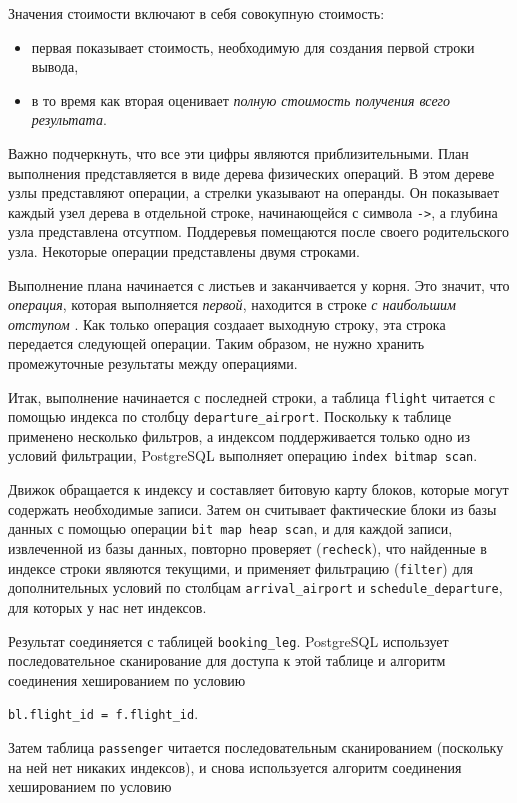 \documentclass[%
	11pt,
	a4paper,
	utf8,
		]{article}
\begin{document}
Значения стоимости включают в себя совокупную стоимость:
\begin{itemize}
	\item первая показывает стоимость, необходимую для создания первой строки вывода,
	
	\item  в то время как вторая оценивает \emph{полную стоимость получения всего результата}.
\end{itemize}

Важно подчеркнуть, что все эти цифры являются приблизительными. План выполнения представляется в виде дерева физических операций. В этом дереве узлы представляют операции, а стрелки указывают на операнды. Он показывает каждый узел дерева в отдельной строке, начинающейся с символа \verb|->|, а глубина узла представлена отсутпом. Поддеревья помещаются после своего родительского узла. Некоторые операции представлены двумя строками.

Выполнение плана начинается с листьев и заканчивается у корня. Это значит, что \emph{операция}, которая выполняется \emph{первой}, находится в строке \emph{с наибольшим отступом} \cite[]{dombrovskaya:postgresql-2022}. Как только операция создаает выходную строку, эта строка передается следующей операции. Таким образом, не нужно хранить промежуточные результаты между операциями.

Итак, выполнение начинается с последней строки, а таблица \verb|flight| читается с помощью индекса по столбцу \verb|departure_airport|. Поскольку к таблице применено несколько фильтров, а индексом поддерживается только одно из условий фильтрации, PostgreSQL выполняет операцию \verb|index bitmap scan|. 

Движок обращается к индексу и составляет битовую карту блоков, которые могут содержать необходимые записи. Затем он считывает фактические блоки из базы данных с помощью операции \verb|bit map heap scan|, и для каждой записи, извлеченной из базы данных, повторно проверяет (\verb|recheck|), что найденные в индексе строки являются текущими, и применяет фильтрацию (\verb|filter|) для дополнительных условий по столбцам \verb|arrival_airport| и \verb|schedule_departure|, для которых у нас нет индексов.

Результат соединяется с таблицей \verb|booking_leg|. PostgreSQL использует последовательное сканирование для доступа к этой таблице и алгоритм соединения хешированием по условию

\verb|bl.flight_id = f.flight_id|.

Затем таблица \verb|passenger| читается последовательным сканированием (поскольку на ней нет никаких индексов), и снова используется алгоритм соединения хешированием по условию
\end{document}
